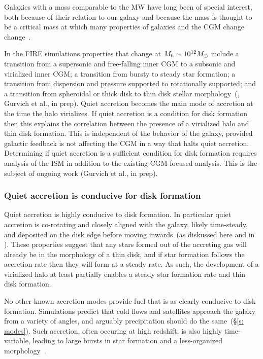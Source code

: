 \documentclass[fleqn,usenatbib]{mnras}
\begin{document}
Galaxies with a mass comparable to the MW have long been of special interest, both because of their relation to our galaxy and because the mass is thought to be a critical mass at which many properties of galaxies and the CGM change change~\citep[e.g.][]{Fielding2017, Correa2017, Dekel2019a}.

In the FIRE simulations properties that change at $M_{\rm h}\sim10^{12} M_\odot$ include a transition from a supersonic and free-falling inner CGM to a subsonic and virialized inner CGM;
a transition from bursty to steady star formation;
a transition from dispersion and pressure supported to rotationally supported;
and a transition from spheroidal or thick disk to thin disk stellar morphology~(\citealt{El-Badry2018a, Stern2020, Yu2021}, Gurvich et al., in prep).
Quiet accretion becomes the main mode of accretion at the time the halo virializes.
If quiet accretion is a condition for disk formation then this explains the correlation between the presence of a virialized halo and thin disk formation.
This is independent of the behavior of the galaxy, provided galactic feedback is not affecting the CGM in a way that halts quiet accretion.
Determining if quiet accretion is a sufficient condition for disk formation requires analysis of the ISM in addition to the existing CGM-focused analysis.
This is the subject of ongoing work (Gurvich et al., in prep).

\subsubsection{Quiet accretion is conducive for disk formation}
\label{s: disk formation -- conducive}

Quiet accretion is highly conducive to disk formation.
In particular quiet accretion is co-rotating and closely aligned with the galaxy, likely time-steady, and deposited on the disk edge before moving inwards~(as diskussed here and in \citealt{Trapp2021}).
These properties suggest that any stars formed out of the accreting gas will already be in the morphology of a thin disk, and if star formation follows the accretion rate then they will form at a steady rate.
As such, the development of a virialized halo at least partially enables a steady star formation rate and thin disk formation.

No other known accretion modes provide fuel that is as clearly conducive to disk formation.
Simulations predict that cold flows and satellites approach the galaxy from a variety of angles, and arguably precipitation should do the same~(\S\ref{s: modes}).
Such accretion, often occuring at high redshift, is also highly time-variable, leading to large bursts in star formation and a less-organized morphology~\citep{Muratov2015, Muratov2017}.
\end{document}
